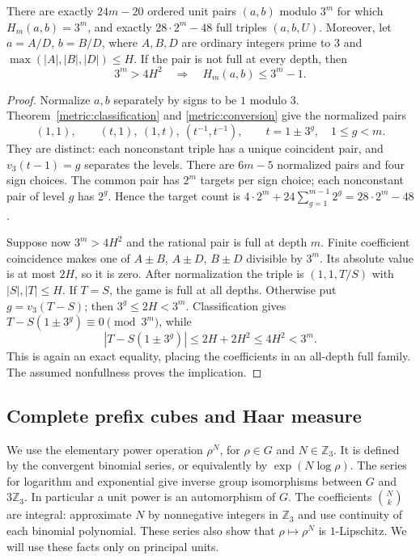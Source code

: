\begin{corollary}
\label{metric:effective}
There are exactly $24m-20$ ordered unit pairs $(a,b)$ modulo $3^m$
for which $H_m(a,b)=3^m$, and exactly $28\cdot2^m-48$ full triples
$(a,b,U)$.
Moreover, let $a=A/D$, $b=B/D$, where $A,B,D$ are ordinary integers
prime to $3$ and $\max(|A|,|B|,|D|)\leq H$. If the pair is not full
at every depth, then
\[
                   3^m>4H^2\quad\Longrightarrow\quad
                   H_m(a,b)\leq3^m-1.
\]
\end{corollary}
\begin{proof}
Normalize $a,b$ separately by signs to be $1$ modulo $3$.
Theorem~\ref{metric:classification} and \eqref{metric:conversion}
give the normalized pairs
\[
 (1,1),\qquad (t,1),\ (1,t),\ (t^{-1},t^{-1}),
 \qquad t=1\pm3^g,\quad1\leq g<m.
\]
They are distinct: each nonconstant triple has a unique coincident
pair, and $v_3(t-1)=g$ separates the levels. There are $6m-5$
normalized pairs and four sign choices. The common pair has $2^m$
targets per sign choice; each nonconstant pair of level $g$ has
$2^g$. Hence the target count is
$4\cdot2^m+24\sum_{g=1}^{m-1}2^g=28\cdot2^m-48$.

Suppose now $3^m>4H^2$ and the rational pair is full at depth $m$.
Finite coefficient coincidence makes one of $A\pm B$, $A\pm D$,
$B\pm D$ divisible by $3^m$. Its absolute value is at most $2H$,
so it is zero. After normalization the triple is $(1,1,T/S)$
with $|S|,|T|\leq H$. If $T=S$, the game is full at all depths.
Otherwise put $g=v_3(T-S)$; then $3^g\leq2H<3^m$.
Classification gives $T-S(1\pm3^g)\equiv0\pmod{3^m}$, while
\[
                 |T-S(1\pm3^g)|\leq2H+2H^2\leq4H^2<3^m.
\]
This is again an exact equality, placing the coefficients in an
all-depth full family. The assumed nonfullness proves the implication.
\end{proof}

\subsection{Complete prefix cubes and Haar measure}

We use the elementary power operation $\rho^N$, for $\rho\in G$ and
$N\in\mathbb Z_3$. It is defined by the convergent binomial series,
or equivalently by $\exp(N\log\rho)$. The series for logarithm and
exponential give inverse group isomorphisms between $G$ and
$3\mathbb Z_3$. In particular a unit power is an automorphism of $G$.
The coefficients $\binom Nk$ are integral: approximate $N$ by
nonnegative integers in $\mathbb Z_3$ and use continuity of each
binomial polynomial. These series also show that
$\rho\mapsto\rho^N$ is $1$-Lipschitz. We will use these facts only
on principal units.

